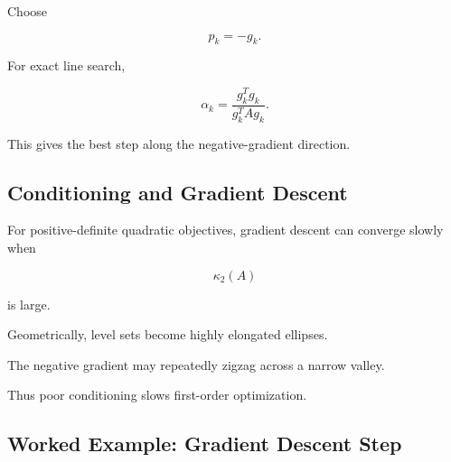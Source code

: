 Choose

\[
p_k=-g_k.
\]

For exact line search,

\[
\boxed{
\alpha_k
=
\frac{
g_k^Tg_k
}{
g_k^TAg_k
}.
}
\]

This gives the best step along the negative-gradient direction.

\subsection{Conditioning and Gradient Descent}
\label{subsec:conditioning-gradient-descent}

For positive-definite quadratic objectives, gradient descent can converge
slowly when

\[
\boxed{
\kappa_2(A)
}
\]

is large.

Geometrically, level sets become highly elongated ellipses.

The negative gradient may repeatedly zigzag across a narrow valley.

Thus poor conditioning slows first-order optimization.

\subsection{Worked Example: Gradient Descent Step}
\label{subsec:worked-gradient-descent-step}

